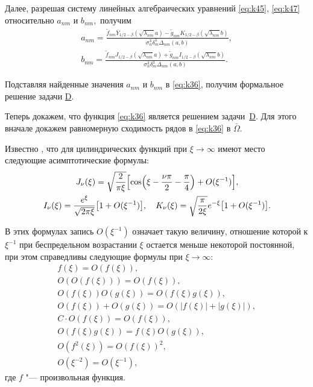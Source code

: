 	Далее, разрешая систему линейных алгебраических уравнений \eqref{eq:k45}, \eqref{eq:k47} относительно $a_{nm} $ и $b_{nm}, $ получим
\begin{gather*}
a_{nm}=\frac{\tilde f_{nm}\bar Y_{ 1/2 -\beta}(\sqrt{\lambda_{nm}}a)-\tilde g_{nm}K_{ 1/2 -\beta}(\sqrt{\lambda_{nm}}b)}{\sigma_n^3\delta_m^3\Delta_{nm}(a,b)},
\\
b_{nm}=\frac{\tilde f_{nm}J_{ 1/2 -\beta}(\sqrt{\lambda_{nm}}a)+\tilde g_{nm}I_{ 1/2 -\beta}(\sqrt{\lambda_{nm}}b)}{\sigma_n^3\delta_m^3\Delta_{nm}(a,b)}.
\end{gather*}

Подставляя найденные значения $a_{nm} $ и $b_{nm} $ в \eqref{eq:k36}, получим формальное решение задачи \hyperlink{task:D}{D}.


Теперь докажем, что функция \eqref{eq:k36} является решением задачи~\hyperlink{task:D}{D}. 
Для этого вначале докажем равномерную сходимость рядов в \eqref{eq:k36} в $\bar \Omega. $

Известно \cite[форм.~(32.31) и (32.33)]{uk:bib:Kuznetsov}, что для цилиндрических функций при $\xi\to\infty$ имеют место следующие асимптотические формулы:
\begin{gather}
J_\nu(\xi)=\sqrt{\frac{2}{\pi\xi}}\Bigl[\cos\Bigl(\xi-\frac{\nu\pi}{2}-\frac{\pi}{4}\Bigr)+O(\xi^{-1})\Bigr],
\label{eq:k48}
\\
I_\nu(\xi)=\frac{e^\xi}{\sqrt{2\pi\xi}}\bigl[1+O(\xi^{-1})\bigr],\quad K_\nu(\xi)=\sqrt{\frac{\pi}{2\xi}}e^{-\xi}\bigl[1+O(\xi^{-1})\bigr].
\label{eq:k49}
\end{gather}

В этих формулах запись $O(\xi^{-1})$ \cite[\S~2]{uk:bib:Olver} означает такую величину, отношение которой к $\xi^{-1} $ при беспредельном возрастании $\xi$ остается меньше некоторой постоянной, 
при этом справедливы следующие формулы при $\xi\to\infty$:
\begin{gather}
f(\xi)=O(f(\xi)),
\label{eq:k50}
\\
O(O(f(\xi)))=O(f(\xi)),
\label{eq:k52}
\\
O(f(\xi))O(g(\xi))=O(f(\xi)g(\xi)),
\label{eq:k52}
\\
O(f(\xi))+O(g(\xi))=O(|f(\xi)|+|g(\xi)|),
\label{eq:k53}
\\
C\cdot O(f(\xi))=O(f(\xi)),
\label{eq:k54}
\\
O(f(\xi)g(\xi))=f(\xi)O(g(\xi)),
\label{eq:k55}
\\
O(f^2(\xi))=O(f(\xi))^2,
\label{eq:k57}
\\
O (\xi^{-2})=O(\xi^{-1}),
\label{eq:k57}
\end{gather}
где $f$ "--- произвольная функция.


